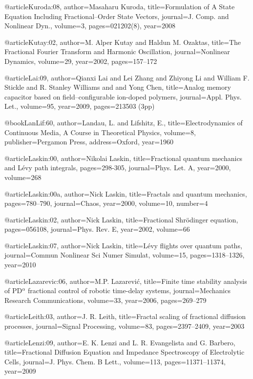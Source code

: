 \begin{thebibliography}{99}
@article{Kuroda:08,
  author={Masaharu Kuroda},
  title={Formulation of A State Equation Including Fractional--Order State Vectors},
  journal={J. Comp. and Nonlinear Dyn.},
  volume={3},
  pages={021202(8)},
  year={2008}
}

@article{Kutay:02,
  author={M. Alper Kutay and Haldun M. Ozaktas},
  title={The {F}ractional {F}ourier {T}ransform and Harmonic Oscillation},
  journal={Nonlinear Dynamics},
  volume={29},
  year={2002},
  pages={157--172}
}

@article{Lai:09,
  author={Qianxi Lai and Lei Zhang and Zhiyong Li and William F. Stickle and R.
    Stanley Williams and and Yong Chen},
  title={Analog memory capacitor based on field--configurable ion-doped polymers},
  journal={Appl. Phys. Let.},
  volume={95},
  year={2009},
  pages={213503 (3pp)}
}

@book{LanLif:60,
  author={Landau, L. and Lifshitz, E.},
  title={Electrodynamics of Continuous Media, A Course in Theoretical Physics},
  volume={8},
  publisher={Pergamon Press},
  address={Oxford},
  year={1960}
}

@article{Laskin:00,
  author={Nikolai Laskin},
  title={Fractional quantum mechanics and {L}\'{e}vy path integrals},
  pages={298-305},
  journal={Phys. Let. A},
  year={2000},
  volume={268}
}

@article{Laskin:00a,
  author={Nick Laskin},
  title={Fractals and quantum mechanics},
  pages={780--790},
  journal={Chaos},
  year={2000},
  volume={10},
  number={4}
}

@article{Laskin:02,
  author={Nick Laskin},
  title={Fractional {S}hr\"{o}dinger equation},
  pages={056108},
  journal={Phys. Rev. E},
  year={2002},
  volume={66}
}

@article{Laskin:07,
  author={Nick Laskin},
  title={L\'{e}vy flights over quantum paths},
  journal={Commun Nonlinear Sci Numer Simulat},
  volume={15},
  pages={1318--1326},
  year={2010}
}

@article{Lazarevic:06,
  author={M.P. Lazarevi{\'c}},
  title={Finite time stability analysis of {PD$^\alpha$} fractional control of
    robotic time-delay systems},
  journal={Mechanics Research Communications},
  volume={33},
  year={2006},
  pages={269--279}
}

@article{Leith:03,
  author={J. R. Leith},
  title={Fractal scaling of fractional diffusion processes},
  journal={Signal Processing},
  volume={83},
  pages={2397--2409},
  year={2003}
}

@article{Lenzi:09,
  author={E. K. Lenzi and L. R. Evangelista and G. Barbero},
  title={Fractional Diffusion Equation and Impedance Spectroscopy of Electrolytic
    Cells},
  journal={J. Phys. Chem. B Lett.},
  volume={113},
  pages={11371--11374},
  year={2009}
}


\end{thebibliography}
